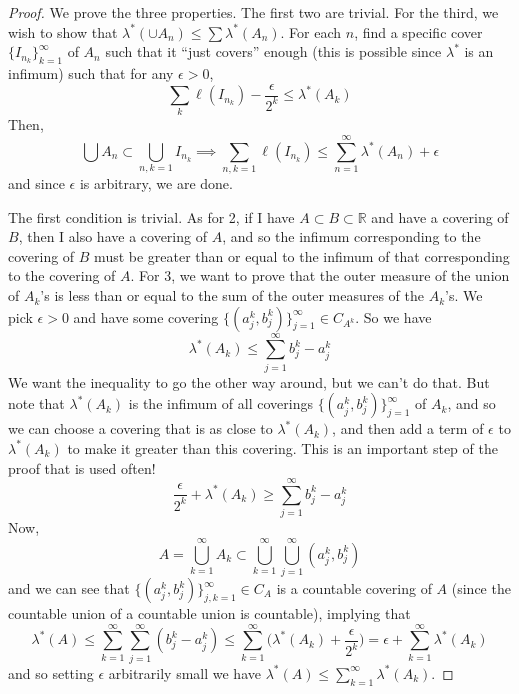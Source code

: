   \begin{proof}
    We prove the three properties. The first two are trivial. For the third, we wish to show that $\lambda^\ast ( \cup A_n) \leq \sum \lambda^\ast (A_n)$. For each $n$, find a specific cover $\{I_{n_k}\}_{k=1}^\infty$ of $A_n$ such that it ``just covers'' enough (this is possible since $\lambda^\ast$ is an infimum) such that for any $\epsilon > 0$, 
    \begin{equation}
      \sum_k \ell(I_{n_k}) - \frac{\epsilon}{2^k} \leq \lambda^\ast (A_k)
    \end{equation} 
    Then, 
    \begin{equation}
      \bigcup A_n \subset \bigcup_{n, k = 1} I_{n_k} \implies \sum_{n, k = 1} \ell(I_{n_k}) \leq \sum_{n=1}^\infty \lambda^\ast (A_n) + \epsilon
    \end{equation}
    and since $\epsilon$ is arbitrary, we are done. 

    The first condition is trivial. As for 2, if I have $A \subset B \subset \mathbb{R}$ and have a covering of $B$, then I also have a covering of $A$, and so the infimum corresponding to the covering of $B$ must be greater than or equal to the infimum of that corresponding to the covering of $A$. For 3, we want to prove that the outer measure of the union of $A_k$'s is less than or equal to the sum of the outer measures of the $A_k$'s. We pick $\epsilon > 0$ and have some covering $\{(a^k_j, b^k_j)\}_{j=1}^\infty \in C_{A^k}$. So we have 
    \begin{equation}
      \lambda^*(A_k) \leq \sum_{j=1}^\infty b^k_j - a^k_j
    \end{equation}
    We want the inequality to go the other way around, but we can't do that. But note that $\lambda^* (A_k)$ is the infimum of all coverings $\{(a^k_j, b^k_j)\}_{j=1}^\infty$ of $A_k$, and so we can choose a covering that is as close to $\lambda^* (A_k)$, and then add a term of $\epsilon$ to $\lambda^*(A_k)$ to make it greater than this covering. This is an important step of the proof that is used often! 
    \begin{equation}
      \frac{\epsilon}{2^k} + \lambda^* (A_k) \geq \sum_{j=1}^\infty b_j^k - a_j^k 
    \end{equation}
    Now, 
    \begin{equation}
      A = \bigcup_{k=1}^\infty A_k \subset \bigcup_{k=1}^\infty \bigcup_{j=1}^\infty (a_j^k, b_j^k)
    \end{equation}
    and we can see that $\{(a_j^k , b_j^k)\}_{j, k=1}^\infty \in C_A$ is a countable covering of $A$ (since the countable union of a countable union is countable), implying that 
    \begin{equation}
      \lambda^* (A) \leq \sum_{k=1}^\infty \sum_{j=1}^\infty (b_j^k - a_j^k) \leq \sum_{k=1}^\infty \bigg( \lambda^* (A_k) + \frac{\epsilon}{2^k} \bigg) = \epsilon + \sum_{k=1}^\infty \lambda^*(A_k)
    \end{equation}
    and so setting $\epsilon$ arbitrarily small we have $\lambda^* (A) \leq \sum_{k=1}^\infty \lambda^* (A_k)$. 
  \end{proof}

